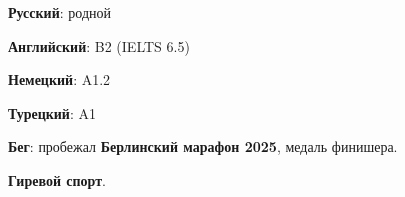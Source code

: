 \documentclass[10pt]{article}
\begin{document}
\begin{plainlist}
  \item \textbf{Русский}: родной
  \item \textbf{Английский}: B2 (IELTS 6.5)
  \item \textbf{Немецкий}: A1.2
  \item \textbf{Турецкий}: A1
\end{plainlist}

\begin{plainlist}
  \item \textbf{Бег}: пробежал \textbf{Берлинский марафон 2025}, медаль финишера.
  \item \textbf{Гиревой спорт}.
\end{plainlist}
\end{document}

